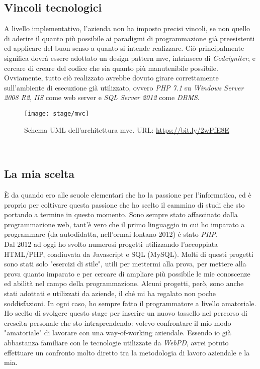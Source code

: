 \subsection{Vincoli tecnologici}
A livello implementativo, l'azienda non ha imposto precisi vincoli, se non quello di aderire il quanto più possibile ai paradigmi di programmazione già preesistenti ed applicare del buon senso a quanto si intende realizzare. Ciò principalmente significa dovrà essere adottato un design pattern \gls{mvc}, intrinseco di \textit{Codeigniter}, e cercare di creare del codice che 
sia quanto più manutenibile possibile. Ovviamente, tutto ciò realizzato avrebbe dovuto girare correttamente sull'ambiente di esecuzione già utilizzato, ovvero \textit{PHP 7.1} su \textit{Windows Server 2008 R2}, \textit{IIS} come web server e \textit{SQL Server 2012} come \textit{DBMS}.
\begin{figure}[!h] 
	\centering 
	\texttt{[image: stage/mvc]} 
	\caption{Schema UML dell'architettura \gls{mvc}. URL: \url{https://bit.ly/2wPfE8E} }
\end{figure}\\

\subsection{La mia scelta}
È da quando ero alle scuole elementari che ho la passione per l'informatica, ed è proprio per coltivare questa passione che ho scelto il cammino di studi che sto portando a termine in questo momento. Sono sempre stato affascinato dalla programmazione web, tant'è vero che il primo linguaggio in cui ho imparato a programmare (da autodidatta, nell'ormai lontano 2012) é stato \textit{PHP}.\\
Dal 2012 ad oggi ho svolto numerosi progetti utilizzando l'accoppiata HTML/PHP, coadiuvata da Javascript e SQL (MySQL). Molti di questi progetti sono stati solo "esercizi di stile", utili per mettermi alla prova, per mettere alla prova quanto imparato e per cercare di ampliare più possibile le mie conoscenze ed abilità nel campo della programmazione. Alcuni progetti, però, sono anche stati adottati e utilizzati da aziende, il ché mi ha regalato non poche soddisfazioni. In ogni caso, ho sempre fatto il programmatore a livello amatoriale.\\
Ho scelto di svolgere questo stage per inserire un nuovo tassello nel percorso di crescita personale che sto intraprendendo: volevo confrontare il mio modo "amatoriale" di lavorare con una way-of-working aziendale. Essendo io già abbastanza familiare con le tecnologie utilizzate da \textit{WebPD}, avrei potuto effettuare un confronto molto diretto tra la metodologia di lavoro aziendale e la mia. 